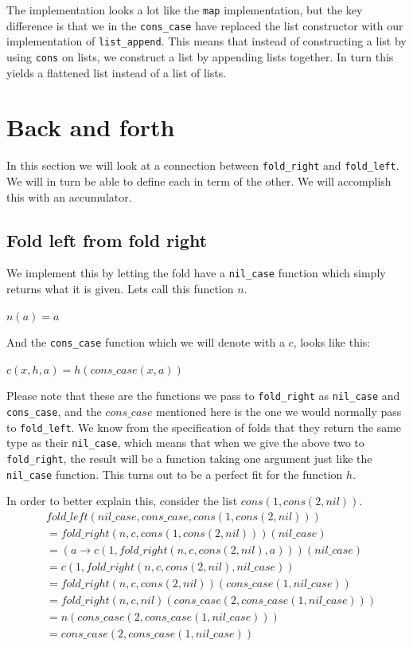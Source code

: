 \documentclass[a4paper]{article}
\begin{document}
The implementation looks a lot like the \texttt{map} implementation, but the
key difference is that we in the \texttt{cons\_case} have replaced the list
constructor with our implementation of \texttt{list\_append}. This means that
instead of constructing a list by using \texttt{cons} on lists, we construct a
list by appending lists together. In turn this yields a flattened list instead
of a list of lists.

\section{Back and forth}
In this section we will look at a connection between \texttt{fold\_right} and
\texttt{fold\_left}. We will in turn be able to define each in term of the
other. We will accomplish this with an accumulator.

\subsection{Fold left from fold right}
We implement this by letting the fold have a \texttt{nil\_case} function which
simply returns what it is given. Lets call this function $n$.

\begin{center}
  $n(a) = a$
\end{center}

And the \texttt{cons\_case} function which we will denote with a $c$, looks
like this:

\begin{center}
  $c(x, h, a) = h (cons\_case(x, a))$
\end{center}

Please note that these are the functions we pass to \texttt{fold\_right} as
\texttt{nil\_case} and \texttt{cons\_case}, and the $cons\_case$ mentioned here
is the one we would normally pass to \texttt{fold\_left}. We know from the
specification of folds that they return the same type as their
\texttt{nil\_case}, which means that when we give the above two to
\texttt{fold\_right}, the result will be a function taking one argument just
like the \texttt{nil\_case} function. This turns out to be a perfect fit for
the function $h$.

In order to better explain this, consider the list $cons(1,cons(2, nil))$. 
\begin{align*}
        &fold\_left(nil\_case, cons\_case, cons(1,cons(2, nil))) 
  \\ &= fold\_right(n, c, cons(1,cons(2, nil)))(nil\_case)
  \\ &= (a \rightarrow c(1, fold\_right(n, c, cons(2,nil), a)))(nil\_case)
  \\ &= c(1, fold\_right(n, c, cons(2,nil), nil\_case))
  \\ &= fold\_right(n, c, cons(2,nil))(cons\_case(1,nil\_case))
  \\ &= fold\_right(n, c, nil)(cons\_case(2,cons\_case(1,nil\_case)))
  \\ &= n(cons\_case(2,cons\_case(1,nil\_case)))
  \\ &= cons\_case(2,cons\_case(1,nil\_case))
\end{align*}
\end{document}
